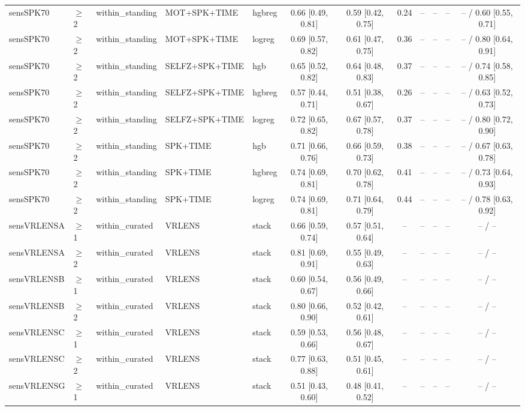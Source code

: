 \begin{longtable}{@{}lllllcccrrrc@{}}
sensSPK70 & $\geq$2 & within\_standing & MOT+SPK+TIME & hgbreg & 0.66 [0.49, 0.81] & 0.59 [0.42, 0.75] & 0.24 & -- & -- & -- & -- / 0.60 [0.55, 0.71] \\
sensSPK70 & $\geq$2 & within\_standing & MOT+SPK+TIME & logreg & 0.69 [0.57, 0.82] & 0.61 [0.47, 0.75] & 0.36 & -- & -- & -- & -- / 0.80 [0.64, 0.91] \\
sensSPK70 & $\geq$2 & within\_standing & SELFZ+SPK+TIME & hgb & 0.65 [0.52, 0.82] & 0.64 [0.48, 0.83] & 0.37 & -- & -- & -- & -- / 0.74 [0.58, 0.85] \\
sensSPK70 & $\geq$2 & within\_standing & SELFZ+SPK+TIME & hgbreg & 0.57 [0.44, 0.71] & 0.51 [0.38, 0.67] & 0.26 & -- & -- & -- & -- / 0.63 [0.52, 0.73] \\
sensSPK70 & $\geq$2 & within\_standing & SELFZ+SPK+TIME & logreg & 0.72 [0.65, 0.82] & 0.67 [0.57, 0.78] & 0.37 & -- & -- & -- & -- / 0.80 [0.72, 0.90] \\
sensSPK70 & $\geq$2 & within\_standing & SPK+TIME & hgb & 0.71 [0.66, 0.76] & 0.66 [0.59, 0.73] & 0.38 & -- & -- & -- & -- / 0.67 [0.63, 0.78] \\
sensSPK70 & $\geq$2 & within\_standing & SPK+TIME & hgbreg & 0.74 [0.69, 0.81] & 0.70 [0.62, 0.78] & 0.41 & -- & -- & -- & -- / 0.73 [0.64, 0.93] \\
sensSPK70 & $\geq$2 & within\_standing & SPK+TIME & logreg & 0.74 [0.69, 0.81] & 0.71 [0.64, 0.79] & 0.44 & -- & -- & -- & -- / 0.78 [0.63, 0.92] \\
sensVRLENSA & $\geq$1 & within\_curated & VRLENS & stack & 0.66 [0.59, 0.74] & 0.57 [0.51, 0.64] & -- & -- & -- & -- & -- / -- \\
sensVRLENSA & $\geq$2 & within\_curated & VRLENS & stack & 0.81 [0.69, 0.91] & 0.55 [0.49, 0.63] & -- & -- & -- & -- & -- / -- \\
sensVRLENSB & $\geq$1 & within\_curated & VRLENS & stack & 0.60 [0.54, 0.67] & 0.56 [0.49, 0.66] & -- & -- & -- & -- & -- / -- \\
sensVRLENSB & $\geq$2 & within\_curated & VRLENS & stack & 0.80 [0.66, 0.90] & 0.52 [0.42, 0.61] & -- & -- & -- & -- & -- / -- \\
sensVRLENSC & $\geq$1 & within\_curated & VRLENS & stack & 0.59 [0.53, 0.66] & 0.56 [0.48, 0.67] & -- & -- & -- & -- & -- / -- \\
sensVRLENSC & $\geq$2 & within\_curated & VRLENS & stack & 0.77 [0.63, 0.88] & 0.51 [0.45, 0.61] & -- & -- & -- & -- & -- / -- \\
sensVRLENSG & $\geq$1 & within\_curated & VRLENS & stack & 0.51 [0.43, 0.60] & 0.48 [0.41, 0.52] & -- & -- & -- & -- & -- / -- \\

\end{longtable}
